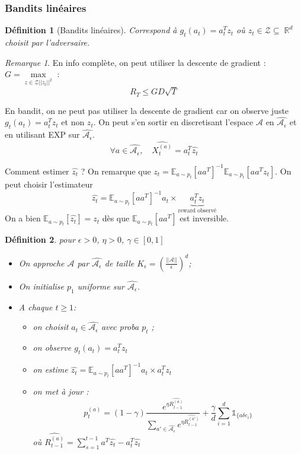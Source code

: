 \documentclass{article}
\DeclareMathOperator*{\R}{\mathbb{R}}
\newtheorem{definition}{Définition}[section]
\theoremstyle{remark}
\theoremstyle{remark}
\newtheorem{remark}{Remarque}[section]
\begin{document}
\subsubsection{Bandits linéaires}

\begin{definition}[Bandits linéaires]
   Correspond à $g_t(a_t) = a_t^T z_t$ où $z_t \in \mathcal{Z} \subseteq \R^d$ choisit par l'adversaire.
\end{definition}

\begin{remark}
   En info complète, on peut utiliser la descente de gradient : $G = \max\limits_{z \in \mathcal{Z} ||z_t||^2}$ :
   $$
   R_T \leq G D \sqrt T
   $$
\end{remark}

En bandit, on ne peut pas utiliser la descente de gradient car on observe juste $g_t(a_t) = a_t^T z_t$ et non $z_t$. On peut s'en sortir en discretisant l'espace $\mathcal{A}$ en $\widehat{\mathcal{A}_\epsilon}$ et en utilisant EXP sur $\widehat{\mathcal{A}_\epsilon}$.
$$
\forall a \in \widehat{\mathcal{A}_\epsilon}, \quad \widehat{X_t^{(a)}} = a_t^T \widehat{z_t}
$$

Comment estimer $\widehat{z_t}$ ? On remarque que $z_t = \mathbb{E}_{a \sim p_t}[a a^T]^{-1} \mathbb{E}_{a \sim p_t}[a a^T z_t]$. On peut choisir l'estimateur
$$
\widehat{z_t} = \mathbb{E}_{a \sim p_t}[a a^T]^{-1} a_t \times \underbrace{a_t^T z_t}_{\text{reward observé}}
$$
On a bien $\mathbb{E}_{a \sim p_t}[\widehat{z_t}] = z_t$ dès que $\mathbb{E}_{a \sim p_t}[a a^T]$ est inversible.

\begin{definition}
   pour $\epsilon > 0$, $\eta > 0$, $\gamma \in [0,1]$
   \begin{itemize}
      \item On approche $\mathcal{A}$ par $\widehat{\mathcal{A}_\epsilon}$ de taille $K_\epsilon = \left(\frac{|| \mathcal{A} ||}{\epsilon}\right)^d$;
      \item On initialise $p_1$ uniforme sur $\widehat{\mathcal{A}_\epsilon}$.
      \item A chaque $t \geq 1$:
      \begin{itemize}
         \item on choisit $a_t \in \widehat{\mathcal{A}_\epsilon}$ avec proba $p_t$ ;
         \item on observe $g_t(a_t) = a_t^T z_t$
         \item on estime  $\widehat{z_t} = \mathbb{E}_{a \sim p_t}[a a^T]^{-1} a_t \times a_t^T z_t$
         \item on met à jour :
         $$
         p_t^{(a)} = (1-\gamma) \frac{e^{\eta \widehat{R_{t-1}^{(a)}}}}{\sum\limits_{a' \in \widehat{\mathcal{A}_\epsilon}} e^{\eta \widehat{R_{t-1}^{(a')}}}}
         + \frac \gamma d \sum_{i=1}^d \mathbb{1}_{\{ a \delta e_i \}}
         $$
         où $\widehat{R_{t-1}^{(a)}} = \sum\limits_{s=1}^{t-1} a^T \widehat{z_t} - a_t^T \widehat{z_t}$
      \end{itemize}
   \end{itemize}
\end{definition}
\end{document}
